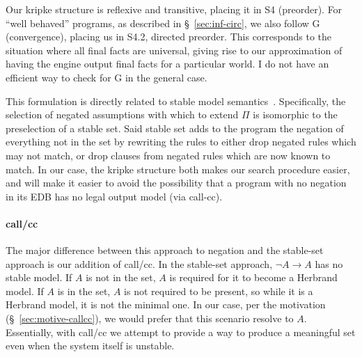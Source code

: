 Our kripke structure is reflexive and transitive, placing it in S4 (preorder).
For ``well behaved'' programs, as described in \S~\ref{sec:inf-circ}, we also follow G (convergence), placing us in S4.2, directed preorder.
This corresponds to the situation where all final facts are universal, giving rise to our approximation of having the engine output final facts for a particular world.
I do not have an efficient way to check for G in the general case.

This formulation is directly related to stable model semantics~\cite{stable-model}.
Specifically, the selection of negated assumptions with which to extend $\Pi$ is isomorphic to the preselection of a stable set.
Said stable set adds to the program the negation of everything not in the set by rewriting the rules to either drop negated rules which may not match, or drop clauses from negated rules which are now known to match.
In our case, the kripke structure both makes our search procedure easier, and will make it easier to avoid the possibility that a program with no negation in its EDB has no legal output model (via call-cc).

\paragraph{call/cc}
The major difference between this approach to negation and the stable-set approach is our addition of call/cc.
In the stable-set approach, $\neg A \rightarrow A$ has no stable model.
If $A$ is not in the set, $A$ is required for it to become a Herbrand model.
If $A$ is in the set, $A$ is not required to be present, so while it is a Herbrand model, it is not the minimal one.
In our case, per the motivation (\S~\ref{sec:motive-callcc}), we would prefer that this scenario resolve to $A$.
Essentially, with call/cc we attempt to provide a way to produce a meaningful set even when the system itself is unstable.

